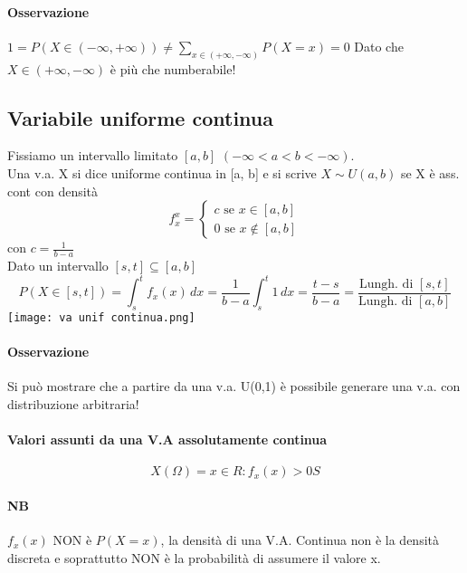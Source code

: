  \paragraph*{Osservazione} $1 = P(X \in (-\infty, +\infty)) 
 \neq \sum_{x \in (+\infty, -\infty)} P (X = x) = 0$ Dato che $X \in (+\infty, -\infty)$
 è più che numberabile!
 
\subsection{Variabile uniforme continua}
Fissiamo un intervallo limitato $[a, b]$ $(-\infty < a < b < -\infty)$.
\\ Una v.a. X si dice uniforme continua in [a, b] e si scrive $X \sim U(a, b)$
se X è ass. cont con densità
\begin{equation*}
    f_x^{x} =
    \begin{cases}
        c \text{ se } x \in [a, b]\\
        0 \text{ se } x \notin [a, b]
    \end{cases} 
\end{equation*}
con $c = \frac{1}{b-a}$
\\ Dato un intervallo $[s, t] \subseteq [a, b]$
\begin{equation*}
    P(X \in [s,t]) = \int_s^t f_x (x) \,dx = 
    \frac{1}{b -a} \int_s^t 1 \,dx = \frac{t-s}{b-a} =
    \frac{\text{Lungh. di } [s,t]}{\text{Lungh. di } [a, b]}
\end{equation*} 
\texttt{[image: va unif continua.png]}
\paragraph*{Osservazione} Si può mostrare che a partire da una v.a. U(0,1) è possibile
generare una v.a. con distribuzione arbitraria!

\paragraph*{Valori assunti da una V.A assolutamente continua}
\begin{equation*}
    X(\Omega) = {x \in R: f_x(x) > 0S}
\end{equation*}

\paragraph{NB} $f_x(x)$ NON è $P(X=x)$, la densità  di una V.A. Continua non è la densità discreta 
e soprattutto NON è la probabilità di assumere il valore x.

